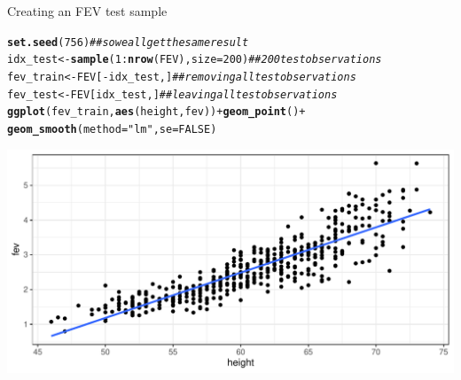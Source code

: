 \documentclass[table]{beamer}\usepackage[]{graphicx}\usepackage[]{color}
\makeatletter
\def\maxwidth{ %
  \ifdim\Gin@nat@width>\linewidth
    \linewidth
  \else
    \Gin@nat@width
  \fi
}
\newcommand{\hlnum}[1]{\textcolor[rgb]{0.686,0.059,0.569}{#1}}%
\newcommand{\hlstr}[1]{\textcolor[rgb]{0.192,0.494,0.8}{#1}}%
\newcommand{\hlcom}[1]{\textcolor[rgb]{0.678,0.584,0.686}{\textit{#1}}}%
\newcommand{\hlopt}[1]{\textcolor[rgb]{0,0,0}{#1}}%
\newcommand{\hlstd}[1]{\textcolor[rgb]{0.345,0.345,0.345}{#1}}%
\newcommand{\hlkwb}[1]{\textcolor[rgb]{0.69,0.353,0.396}{#1}}%
\newcommand{\hlkwc}[1]{\textcolor[rgb]{0.333,0.667,0.333}{#1}}%
\newcommand{\hlkwd}[1]{\textcolor[rgb]{0.737,0.353,0.396}{\textbf{#1}}}%
\newenvironment{kframe}{%
 \def\at@end@of@kframe{}%
 \ifinner\ifhmode%
  \def\at@end@of@kframe{\end{minipage}}%
  \begin{minipage}{\columnwidth}%
 \fi\fi%
 \def\FrameCommand##1{\hskip\@totalleftmargin \hskip-\fboxsep
 \colorbox{shadecolor}{##1}\hskip-\fboxsep
     \hskip-\linewidth \hskip-\@totalleftmargin \hskip\columnwidth}%
 \MakeFramed {\advance\hsize-\width
   \@totalleftmargin\z@ \linewidth\hsize
   \@setminipage}}%
 {\par\unskip\endMakeFramed%
 \at@end@of@kframe}
\newenvironment{knitrout}{}{} %
\makeatother
\begin{document}

\begin{frame}[fragile]{Creating an FEV test sample}

\scriptsize
\begin{knitrout}\footnotesize
{}\color{fgcolor}\begin{kframe}
\begin{alltt}
\hlkwd{set.seed}\hlstd{(}\hlnum{756}\hlstd{)}  \hlcom{## so we all get the same result}
\hlstd{idx_test} \hlkwb{<-} \hlkwd{sample}\hlstd{(}\hlnum{1}\hlopt{:}\hlkwd{nrow}\hlstd{(FEV),} \hlkwc{size}\hlstd{=}\hlnum{200}\hlstd{)} \hlcom{## 200 test observations}
\hlstd{fev_train} \hlkwb{<-} \hlstd{FEV[}\hlopt{-}\hlstd{idx_test,]}    \hlcom{## removing all test observations }
\hlstd{fev_test} \hlkwb{<-} \hlstd{FEV[idx_test,]}      \hlcom{## leaving all test observations}
\hlkwd{ggplot}\hlstd{(fev_train,} \hlkwd{aes}\hlstd{(height, fev))} \hlopt{+} \hlkwd{geom_point}\hlstd{()} \hlopt{+}
  \hlkwd{geom_smooth}\hlstd{(}\hlkwc{method}\hlstd{=}\hlstr{"lm"}\hlstd{,} \hlkwc{se}\hlstd{=}\hlnum{FALSE}\hlstd{)}
\end{alltt}
\end{kframe}

{\centering \includegraphics[width=\maxwidth]{figs/beamer-unnamed-chunk-2-1} 

}



\end{knitrout}

\end{frame}

\end{document}
